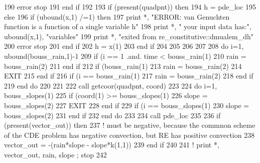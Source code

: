 \begin{DoxyCode}
190           error stop
191 \textcolor{keywordflow}{        end if}
192         
193         \textcolor{keywordflow}{if} (\textcolor{keyword}{present}(quadpnt)) \textcolor{keywordflow}{then}
194           h = pde\_loc%
195         \textcolor{keywordflow}{else}
196           \textcolor{keywordflow}{if} (ubound(x,1) /=1) \textcolor{keywordflow}{then}
197             print *, \textcolor{stringliteral}{"ERROR: van Genuchten function is a function of a single variable h"}
198             print *, \textcolor{stringliteral}{"       your input data has:"}, ubound(x,1), \textcolor{stringliteral}{"variables"}
199             print *, \textcolor{stringliteral}{"exited from re\_constitutive::dmualem\_dh"}
200             error stop
201 \textcolor{keywordflow}{          end if}
202           h = x(1)
203 \textcolor{keywordflow}{        end if}
204         
205         
206         
207         
208         \textcolor{keywordflow}{do} i=1, ubound(bouss_rain,1)-1
209           \textcolor{keywordflow}{if} (i == 1 .and. time < bouss_rain(1)%
210             rain = bouss_rain(2)%
211 \textcolor{keywordflow}{          end if}
212           \textcolor{keywordflow}{if} (bouss_rain(1)%
213             rain = bouss_rain(2)%
214             \textcolor{keywordflow}{EXIT}
215 \textcolor{keywordflow}{          end if}
216           \textcolor{keywordflow}{if} (i == bouss_rain(1)%
217             rain = bouss_rain(2)%
218 \textcolor{keywordflow}{          end if}
219 \textcolor{keywordflow}{        end do}
220         
221         
222         \textcolor{keyword}{call }getcoor(quadpnt, coord)
223         
224         \textcolor{keywordflow}{do} i=1, bouss_slopes(1)%
225           \textcolor{keywordflow}{if} (coord(1) >= bouss_slopes(1)%
226             slope = bouss_slopes(2)%
227             \textcolor{keywordflow}{EXIT}
228 \textcolor{keywordflow}{          end if}
229           \textcolor{keywordflow}{if} (i == bouss_slopes(1)%
230             slope = bouss_slopes(2)%
231 \textcolor{keywordflow}{          end if}
232 \textcolor{keywordflow}{        end do}
233         
234         \textcolor{keyword}{call }pde\_loc%
235 
236         \textcolor{keywordflow}{if} (\textcolor{keyword}{present}(vector\_out)) \textcolor{keywordflow}{then}
237           \textcolor{comment}{! must be negative, because the commnon scheme of the CDE problem has negative convection, but RE
       has positive convection}
238           vector\_out = -(rain*slope - slope*k(1,1))
239 \textcolor{keywordflow}{        end if}
240 
241 \textcolor{comment}{! print *, vector\_out, rain, slope ; stop}
242 
\end{DoxyCode}


